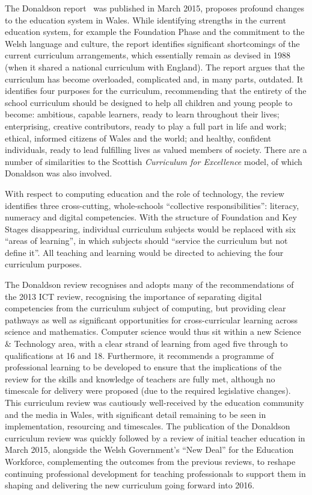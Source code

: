 \documentclass{llncs}
\begin{document}
The Donaldson report~\cite{Donaldson:2015} was published in March
2015, proposes profound changes to the education system in
Wales. While identifying strengths in the current education system,
for example the Foundation Phase and the commitment to the Welsh
language and culture, the report identifies significant shortcomings
of the current curriculum arrangements, which essentially remain as
devised in 1988 (when it shared a national curriculum with
England). The report argues that the curriculum has become overloaded,
complicated and, in many parts, outdated. It identifies four purposes
for the curriculum, recommending that the entirety of the school
curriculum should be designed to help all children and young people to
become: ambitious, capable learners, ready to learn throughout their
lives; enterprising, creative contributors, ready to play a full part
in life and work; ethical, informed citizens of Wales and the world;
and healthy, confident individuals, ready to lead fulfilling lives as
valued members of society. There are a number of similarities to the
Scottish {\emph{Curriculum for Excellence}}
model, of which Donaldson was also involved.

With respect to computing education and the role of technology, the
review identifies three cross-cutting, whole-schools ``collective
responsibilities'': literacy, numeracy and digital competencies. With
the structure of Foundation and Key Stages disappearing, individual
curriculum subjects would be replaced with six ``areas of learning'',
in which subjects should ``service the curriculum but not define
it''. All teaching and learning would be directed to achieving the
four curriculum purposes.

The Donaldson review recognises and adopts many of the recommendations
of the 2013 ICT review, recognising the importance of separating
digital competencies from the curriculum subject of computing, but
providing clear pathways as well as significant opportunities for
cross-curricular learning across science and mathematics. Computer
science would thus sit within a new Science \& Technology area, with a
clear strand of learning from aged five through to qualifications at
16 and 18. Furthermore, it recommends a programme of professional
learning to be developed to ensure that the implications of the review
for the skills and knowledge of teachers are fully met, although no
timescale for delivery were proposed (due to the required legislative
changes). This curriculum review was cautiously well-received by the
education community and the media in Wales, with significant detail
remaining to be seen in implementation, resourcing and timescales. The
publication of the Donaldson curriculum review was quickly followed by
a review of initial teacher education in March 2015, alongside the
Welsh Government's ``New Deal'' for the Education Workforce,
complementing the outcomes from the previous reviews, to reshape
continuing professional development for teaching professionals to
support them in shaping and delivering the new curriculum going
forward into 2016.
\end{document}
